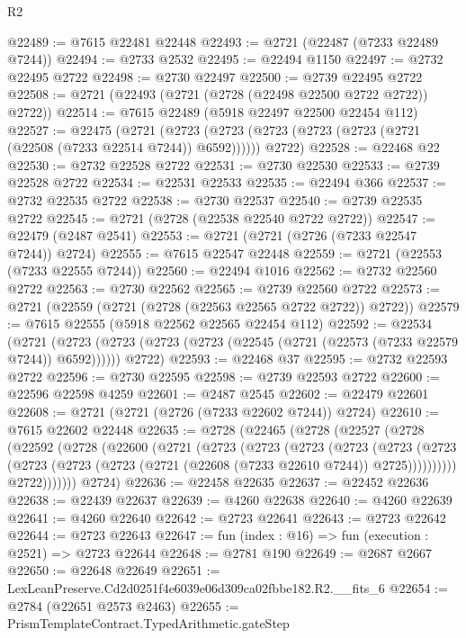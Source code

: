 \begin{lexlean}{R2}
\begin{coremodule}
@22489 := @7615 @22481 @22448
@22493 := @2721 (@22487 (@7233 @22489 @7244))
@22494 := @2733 @2532
@22495 := @22494 @1150
@22497 := @2732 @22495 @2722
@22498 := @2730 @22497
@22500 := @2739 @22495 @2722
@22508 := @2721 (@22493 (@2721 (@2728 (@22498 @22500 @2722 @2722)) @2722))
@22514 := @7615 @22489 (@5918 @22497 @22500 @22454 @112)
@22527 := @22475
    (@2721
      (@2723 (@2723 (@2723 (@2723 (@2723 (@2721 (@22508 (@7233 @22514 @7244)) @6592))))))
      @2722)
@22528 := @22468 @22
@22530 := @2732 @22528 @2722
@22531 := @2730 @22530
@22533 := @2739 @22528 @2722
@22534 := @22531 @22533
@22535 := @22494 @366
@22537 := @2732 @22535 @2722
@22538 := @2730 @22537
@22540 := @2739 @22535 @2722
@22545 := @2721 (@2728 (@22538 @22540 @2722 @2722))
@22547 := @22479 (@2487 @2541)
@22553 := @2721 (@2721 (@2726 (@7233 @22547 @7244)) @2724)
@22555 := @7615 @22547 @22448
@22559 := @2721 (@22553 (@7233 @22555 @7244))
@22560 := @22494 @1016
@22562 := @2732 @22560 @2722
@22563 := @2730 @22562
@22565 := @2739 @22560 @2722
@22573 := @2721 (@22559 (@2721 (@2728 (@22563 @22565 @2722 @2722)) @2722))
@22579 := @7615 @22555 (@5918 @22562 @22565 @22454 @112)
@22592 := @22534
    (@2721
      (@2723 (@2723 (@2723 (@2723 (@22545 (@2721 (@22573 (@7233 @22579 @7244)) @6592))))))
      @2722)
@22593 := @22468 @37
@22595 := @2732 @22593 @2722
@22596 := @2730 @22595
@22598 := @2739 @22593 @2722
@22600 := @22596 @22598 @4259
@22601 := @2487 @2545
@22602 := @22479 @22601
@22608 := @2721 (@2721 (@2726 (@7233 @22602 @7244)) @2724)
@22610 := @7615 @22602 @22448
@22635 := @2728
    (@22465
      (@2728
        (@22527
          (@2728
            (@22592
              (@2728
                (@22600
                  (@2721
                    (@2723
                      (@2723
                        (@2723
                          (@2723
                            (@2723
                              (@2723
                                (@2723
                                  (@2723 (@2723 (@2721 (@22608 (@7233 @22610 @7244)) @2725))))))))))
                    @2722)))))))
      @2724)
@22636 := @22458 @22635
@22637 := @22452 @22636
@22638 := @22439 @22637
@22639 := @4260 @22638
@22640 := @4260 @22639
@22641 := @4260 @22640
@22642 := @2723 @22641
@22643 := @2723 @22642
@22644 := @2723 @22643
@22647 := fun (index : @16) => fun (execution : @2521) => @2723 @22644
@22648 := @2781 @190
@22649 := @2687 @2667
@22650 := @22648 @22649
@22651 := LexLeanPreserve.Cd2d0251f4e6039e06d309ca02fbbe182.R2.__fits_6
@22654 := @2784 (@22651 @2573 @2463)
@22655 := PrismTemplateContract.TypedArithmetic.gateStep

\end{coremodule}
\end{lexlean}
